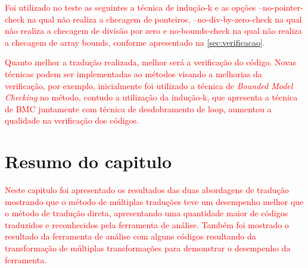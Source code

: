 \textcolor{red}{Foi utilizado no teste as seguintes a técnica de indução-k e as opções --no-pointer-check na qual não realiza a checagem de ponteiros, --no-div-by-zero-check na qual não realiza a checagem de divisão por zero e no-bounds-check na qual não realiza a checagem de array bounds, conforme apresentado na \autoref{sec:verificacao}.} 

\par
\textcolor{red}{Quanto melhor a tradução realizada, melhor será a verificação do código. Novas técnicas podem ser implementadas ao métodos visando a melhorias da verificação, por exemplo, inicialmente foi utilizado a técnica de \textit{Bounded Model Checking} no método, contudo a utilização da indução-k, que apresenta a técnica de BMC juntamente com técnica de desdobramento de loop\cite{gadelhaesbmc}, aumentou a qualidade na verificação dos códigos.}

\section{Resumo do capitulo}
\par
\textcolor{red}{Neste capitulo foi apresentado os resultados das duas abordagens de tradução mostrando que o método de múltiplas traduções teve um desempenho melhor que o método de tradução direta, apresentando uma quantidade maior de códigos traduzidos e reconhecidos pela ferramenta de análise. Também foi mostrado o resultado da ferramenta de análise com alguns códigos resultando da transformação de múltiplas transformações para demonstrar o desempenho da ferramenta.}